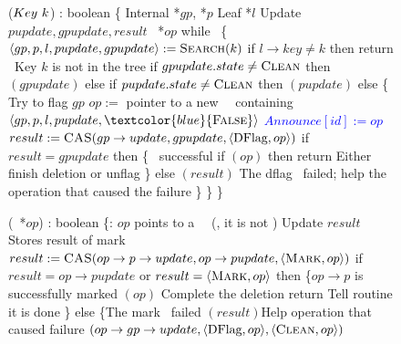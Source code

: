 \begin{figure*}
	\scriptsize
	\begin{code}
		\firstline
		($Key\ k$) : boolean \{\nlc
		\n Internal *$gp$, *$p$\nlc
		Leaf *$l$\nlc
		Update $pupdate, gpupdate, result$\nlc
		\DFlag\ *$op$\bl\nlc
		while \TRUE\ \{ \nlc
		\n     $\langle gp, p, l, pupdate, gpupdate \rangle := \mbox{\sc Search}(k)$\label{del-search}\nlc
		if $l\rightarrow key \neq k$ then return \FALSE\ \tabtabcom Key $k$ is not in the tree\label{delete-false}\nlc
		if $gpupdate.state \neq \mbox{\sc Clean}$ then $(gpupdate)$ \label{del-help-unclean-1}\nlc
		else if $pupdate.state \neq \mbox{\sc Clean}$ then $(pupdate)$\label{del-help-unclean-2}\nlc
		else \{ \tabtabcom Try to flag $gp$\nlc
		\n          $op :=$ pointer to a new \DFlag\ \record\  containing $\langle gp, p, l, pupdate, \textcolor{blue}{\FALSE} \rangle$\label{new-DFlag}\nlc
		\textcolor{blue}{$Announce[id] := op$} \nlc
		$result := \mbox{\sc CAS}(gp\rightarrow update, gpupdate, \langle \mbox{DFlag}, op \rangle)$ \label{dflag-cas}\nlc
		if $result = gpupdate$ then \{ \tabtabcom \CASB\ successful \nlc
		\n             if $(op)$ then return \TRUE \label{delete-true} \tabtabcom Either finish deletion or unflag\nlc
		\p          \}\nlc                 
		else $(result)$ \tabcom The dflag \CASB\ failed; help the operation that caused the failure \label{del-help-after-failure}\nlc%
		\p     \}\nlc
		\p \}\nlc
		\p
		\}\bl
		\nlc
		
		(\DFlag\ *$op$) : boolean \{\ul
		\n   {}:  $op$ points to a \DFlag\ \record\  (\ie, it is not \NULL)\nlc%
		Update $result$ \tabtabcom Stores result of mark \CASB\bl\nlc
		$result := \mbox{\sc CAS}(op\rightarrow p\rightarrow update, op\rightarrow pupdate, \langle \mbox{\sc Mark}, op\rangle)$ \label{mark-cas}\nlc     
		if $result = op\rightarrow pupdate$ or $result = \langle \mbox{\sc Mark}, op\rangle$ then \label{checkmark}\{\tabtabcom $op\rightarrow p$ is successfully marked\nlc
		\n          {}$(op)$ \label{call-hm1} \tabtabcom Complete the deletion\nlc
		return \TRUE\tabtabcom Tell  routine it is done\nlc
		\p       \}\nlc
		else \{\tabtabcom The mark \CASB\ failed \nlc
		\n              
		$(result)$\label{help-after-failed-mark}\tabtabcom Help operation that caused failure\nlc
		\CASB$(op\rightarrow gp\rightarrow update, \langle \mbox{DFlag}, op\rangle, \langle \mbox{\sc Clean}, op\rangle)$ \label{backtrack-cas}\nlc
		

\end{code}
\end{figure*}
